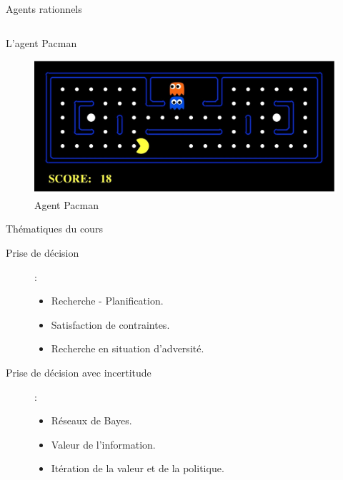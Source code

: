 \documentclass{beamer}
\begin{document}
\begin{frame}[t]{Agents rationnels}
{\begin{columns}
\begin{column}{0.5\textwidth}
    \end{column}
  \end{columns}

}
\end{frame}


\begin{frame}[t]{L'agent Pacman}
  
\begin{figure}[htpb]
  \centering
  \includegraphics[width=0.8\linewidth,height=5cm]{./images/pacman_as_agent.png}
  \caption*{Agent Pacman}
  \label{fig:}
\end{figure}
\end{frame}


\begin{frame}[<+->]{Thématiques du cours}
 \begin{description}
 \item[Prise de décision]:
   \begin{itemize}
     \item Recherche - Planification.
     \item Satisfaction de contraintes.
     \item Recherche en situation d'adversité.
   \end{itemize}

  \item[Prise de décision avec incertitude]:
    \begin{itemize}
  \item Réseaux de Bayes.
  \item Valeur de l'information.
  \item Itération de la valeur et de la politique.
\end{itemize}
 \end{description} 
\end{frame}
\end{document}
